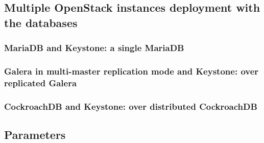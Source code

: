 \subsection{Multiple OpenStack instances deployment with the databases}


\subsubsection{MariaDB and Keystone: a single MariaDB}
\subsubsection{Galera in multi-master replication mode and Keystone: over replicated Galera}
\subsubsection{CockroachDB and Keystone: over distributed CockroachDB}

\subsection{Parameters}
